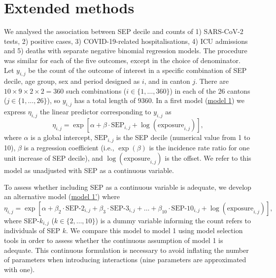 \documentclass{article}
\begin{document}
	\section{Extended methods}
	
	We analysed the association between SEP decile and counts of 1) SARS-CoV-2 tests, 2) positive cases, 3) COVID-19-related hospitalisations, 4) ICU admissions and 5) deaths with separate negative binomial regression models.  
	The procedure was similar for each of the five outcomes, except in the choice of denominator.
	Let $y_{i,j}$ be the count of the outcome of interest in a specific combination of SEP decile, age group, sex and period designed as $i$, and in canton $j$.
	There are $10 \times 9 \times 2 \times 2 = 360$ such combinations ($i \in \{1,\ldots,360\}$) in each of the $26$ cantons ($j\in \{1,\ldots,26\}$), so $y_{i,j}$ has a total length of $9360$. 
	In a first model (\underline{model 1}) we express $\eta_{i,j}$ the linear predictor corresponding to $y_{i,j}$ as
	\begin{equation}
		\eta_{i,j} = \exp\left[ \alpha + \beta\cdot\text{SEP}_{i,j}  + \log(\text{exposure}_{i,j}) \right],
		\label{eq:m1}
	\end{equation}
	where $\alpha$ is a global intercept, $\text{SEP}_{i,j}$ is the SEP decile (numerical value from 1 to 10), $\beta$ is a regression coefficient (i.e., $\exp(\beta)$ is the incidence rate ratio for one unit increase of SEP decile), and $\log(\text{exposure}_{i,j})$ is the offset.
	We refer to this model as unadjusted with SEP as a continuous variable.
	
	To assess whether including SEP as a continuous variable is adequate, we develop an alternative model (\underline{model 1'}) where 
	\begin{equation}
	\eta_{i,j} = \exp\left[ \alpha + \beta_2\cdot\text{SEP-2}_{i,j} + \beta_3\cdot\text{SEP-3}_{i,j} + \ldots + \beta_{10}\cdot\text{SEP-10}_{i,j}  + \log(\text{exposure}_{i,j}) \right],
	\label{eq:m2}
	\end{equation}
	where SEP-$k_{i,j}$ ($k \in \{2,\ldots,10\}$) is a dummy variable informing the count refers to individuals of SEP $k$.
	We compare this model to model 1 using model selection tools in order to assess whether the continuous assumption of model 1 is adequate.
	This continuous formulation is necessary to avoid inflating the number of parameters when introducing interactions (nine parameters are approximated with one).
	
\end{document}
